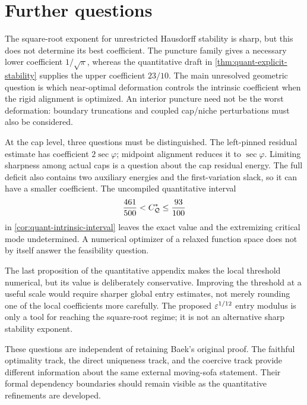 \section{Further questions}\label{sec:quant-questions}

The square-root exponent for unrestricted Hausdorff stability is sharp, but
this does not determine its best coefficient. The puncture family gives a
necessary lower coefficient $1/\sqrt\pi$, whereas the quantitative draft in
\cref{thm:quant-explicit-stability} supplies the upper coefficient $23/10$.
The main unresolved geometric question is which near-optimal deformation
controls the intrinsic coefficient when the rigid alignment is optimized.
An interior puncture need not be the worst deformation: boundary truncations
and coupled cap/niche perturbations must also be considered.

At the cap level, three questions must be distinguished. The left-pinned
residual estimate has coefficient $2\sec\varphi$; midpoint alignment reduces
it to $\sec\varphi$. Limiting sharpness among actual caps is a question about
the cap residual energy. The full deficit also contains two auxiliary
energies and the first-variation slack, so it can have a smaller coefficient.
The uncompiled quantitative interval
\[
 \frac{461}{500}<C_{\mathcal{Q}}^{*}\le\frac{93}{100}
\]
in \cref{cor:quant-intrinsic-interval} leaves the exact value and the
extremizing critical mode undetermined. A numerical optimizer of a relaxed
function space does not by itself answer the feasibility question.

The last proposition of the quantitative appendix makes the local threshold
numerical, but its value is deliberately conservative. Improving the threshold
at a useful scale would require sharper global entry estimates, not merely
rounding one of the local coefficients more carefully. The proposed
$\varepsilon^{1/12}$ entry modulus is only a tool for reaching the square-root regime;
it is not an alternative sharp stability exponent.

These questions are independent of retaining Baek's original proof. The
faithful optimality track, the direct uniqueness track, and the coercive
track provide different information about the same external moving-sofa
statement. Their formal dependency boundaries should remain visible as the
quantitative refinements are developed.

